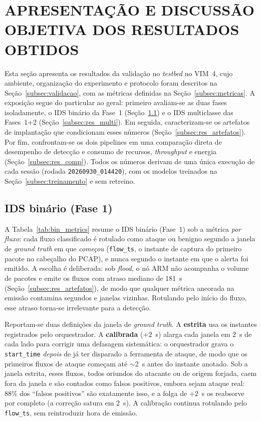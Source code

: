 \documentclass[12pt,a4paper]{article}
\begin{document}
\section{APRESENTAÇÃO E DISCUSSÃO OBJETIVA DOS RESULTADOS OBTIDOS}
\label{sec:resultados}

Esta seção apresenta os resultados da validação no \textit{testbed} no VIM~4,
cujo ambiente, organização do experimento e protocolo foram descritos na
Seção~\ref{subsec:validacao}, com as métricas definidas na
Seção~\ref{subsec:metricas}. A exposição segue do particular ao geral: primeiro
avaliam-se as duas fases isoladamente, o IDS binário da Fase~1
(Seção~\ref{subsec:res_bin}) e o IDS multiclasse das Fases~1+2
(Seção~\ref{subsec:res_multi}). Em seguida, caracterizam-se os artefatos de
implantação que condicionam esses números (Seção~\ref{subsec:res_artefatos}).
Por fim, confrontam-se os dois pipelines em uma comparação direta de desempenho
de detecção e consumo de recursos, \textit{throughput} e energia
(Seção~\ref{subsec:res_comp}). Todos os números derivam de uma única execução
de cada sessão (rodada \texttt{20260930\_014420}), com os modelos treinados na
Seção~\ref{subsec:treinamento} e sem retreino.

\subsection{IDS binário (Fase 1)}
\label{subsec:res_bin}

A Tabela~\ref{tab:bin_metrics} resume o IDS binário (Fase~1) sob a métrica
\emph{por fluxo}: cada fluxo classificado é rotulado como ataque ou benigno
segundo a janela de \textit{ground truth} em que \emph{começou}
(\texttt{flow\_ts}, o instante de captura do primeiro pacote no cabeçalho do
PCAP), e nunca segundo o instante em que o alerta foi emitido. A escolha é
deliberada: sob \textit{flood}, o nó ARM não acompanha o volume de pacotes e
emite os fluxos com atraso mediano de 181~s (Seção~\ref{subsec:res_artefatos}),
de modo que qualquer métrica ancorada na emissão contamina segundos e janelas
vizinhas. Rotulando pelo início do fluxo, esse atraso torna-se irrelevante para a
detecção.

Reportam-se duas definições da janela de \textit{ground truth}. A
\textbf{estrita} usa os instantes registrados pelo orquestrador. A
\textbf{calibrada} ($+2$~s) alarga cada janela em 2~s de cada lado para corrigir
uma defasagem sistemática: o orquestrador grava o \texttt{start\_time}
\emph{depois} de já ter disparado a ferramenta de ataque, de modo que os
primeiros fluxos de ataque começam até $\sim$2~s antes do instante anotado. Sob a
janela estrita, esses fluxos, todos oriundos do atacante ou de origem
forjada, caem fora da janela e são contados como falsos positivos, embora
sejam ataque real: 88\% dos ``falsos positivos'' são exatamente isso, e a folga
de $+2$~s os reabsorve por completo (a correção satura em 2~s). A calibração
continua rotulando pelo \texttt{flow\_ts}, sem reintroduzir hora de emissão.
\end{document}
